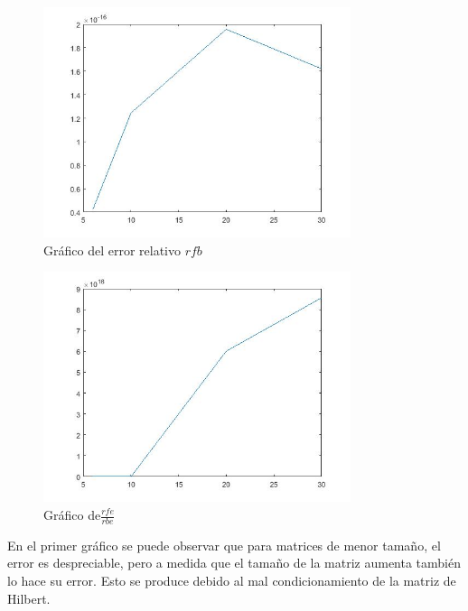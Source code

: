 \documentclass{udpreport}
\begin{document}
\begin{enumerate}
\begin{enumerate}
 			\begin{figure}[H]
 				\centering
 				\includegraphics[width=9cm]{grafo1-rbe}
 				\caption{Gráfico del error relativo $rfb$}		
 			\end{figure}
 			
 			\begin{figure}[H]
 				\centering
 				\includegraphics[width=9cm]{grafo1-div}
 				\caption{Gráfico de$\frac{rfe}{rbe}$}
	
 			\end{figure}
 		
 			En el primer gráfico se puede observar que para matrices de menor tamaño, el error es despreciable, pero a medida que el tamaño de la matriz aumenta también lo hace su error. Esto se produce debido al mal condicionamiento de la matriz de Hilbert.
 		\end{enumerate}
 		

\end{enumerate}
\end{document}
